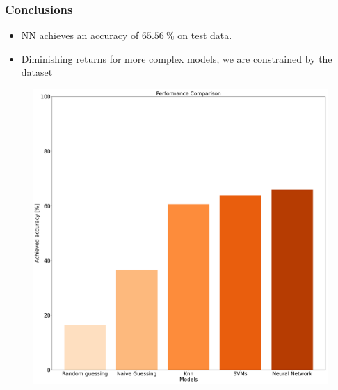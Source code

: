 \documentclass[8pt]{beamer}
\begin{document}
\begin{frame}
\frametitle{Conclusions}
  \begin{itemize}
          \item NN achieves an accuracy of $\SI{65.56}{\percent}$ on test data.
          \item Diminishing returns for more complex models, we are constrained by the dataset
  \end{itemize}
  \begin{figure}
    \centering
    \includegraphics[scale=0.15]{figures/performance-comparison.pdf}
  \end{figure}
\end{frame}


\printbibliography
\end{document}
